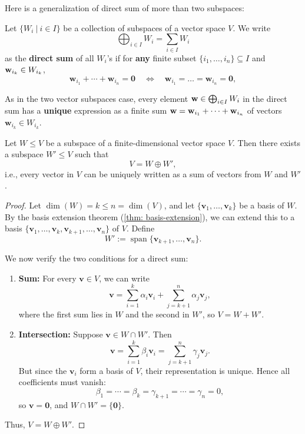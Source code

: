 Here is a generalization of direct sum of more than two subspaces:
\begin{definition}
 Let \( \{ W_i\ |\ i \in I \} \) be a collection of subspaces of a vector space \( V \). We write
\[
\bigoplus_{i \in I} W_i = \sum_{i \in I} W_i 
\]
as the \textbf{direct sum} of all \( W_i\)'s if for {\bf any} finite subset $\{i_1, \dots, i_n\} \subseteq I$ and ${\bf w}_{i_k} \in W_{i_k}$,
\[
\mathbf{w}_{i_1} + \cdots + \mathbf{w}_{i_n} = \mathbf{0} \quad \Leftrightarrow \quad \mathbf{w}_{i_1} = \dots  = \mathbf{w}_{i_n} = \mathbf{0},
\]

\end{definition}
As in the two vector subspaces case, every element \( {\bf w} \in \bigoplus_{i \in I} W_i\) in the direct sum has a \textbf{unique} expression as a finite sum \( {\bf w} = \mathbf{w}_{i_1} + \cdots + \mathbf{w}_{i_n} \) of vectors \( \mathbf{w}_{i_k} \in W_{i_k} \).


\begin{proposition}[Complementation]\label{prop:complementation}
Let \( W \leq V \) be a subspace of a finite-dimensional vector space \( V \). Then there exists a subspace \( W' \leq V \) such that
\[
V = W \oplus W',
\]
i.e., every vector in \( V \) can be uniquely written as a sum of vectors from \( W \) and \( W' \).
\end{proposition}

\begin{proof}
Let \( \dim(W) = k \leq n = \dim(V) \), and let \( \{ \mathbf{v}_1, \ldots, \mathbf{v}_k \} \) be a basis of \( W \).
By the basis extension theorem (\autoref{thm: basis-extension}), we can extend this to a basis $\{ \mathbf{v}_1, \ldots, \mathbf{v}_k, \mathbf{v}_{k+1}, \ldots, \mathbf{v}_n \}$ of \( V \).
Define
\[
W' := \operatorname{span} \{ \mathbf{v}_{k+1}, \ldots, \mathbf{v}_n \}.
\]

We now verify the two conditions for a direct sum:

\begin{enumerate}
\item \textbf{Sum:} For every \( \mathbf{v} \in V \), we can write
\[
\mathbf{v} = \sum_{i=1}^{k} \alpha_i \mathbf{v}_i + \sum_{j=k+1}^{n} \alpha_j \mathbf{v}_j,
\]
where the first sum lies in \( W \) and the second in \( W' \), so \( V = W + W' \).

\item \textbf{Intersection:} Suppose \( \mathbf{v} \in W \cap W' \). Then
\[
\mathbf{v} = \sum_{i=1}^{k} \beta_i \mathbf{v}_i = \sum_{j=k+1}^{n} \gamma_j \mathbf{v}_j.
\]
But since the \( \mathbf{v}_i \) form a basis of \( V \), their representation is unique. Hence all coefficients must vanish:
\[
\beta_1 = \cdots = \beta_k = \gamma_{k+1} = \cdots = \gamma_n = 0,
\]
so \( \mathbf{v} = \mathbf{0} \), and \( W \cap W' = \{ \mathbf{0} \} \).
\end{enumerate}

Thus, \( V = W \oplus W' \).
\end{proof}
